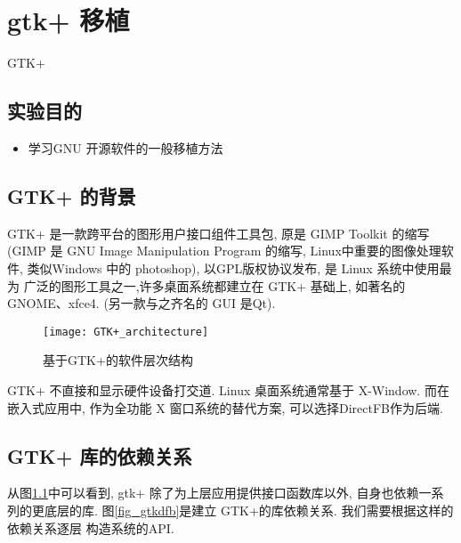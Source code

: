 \chapter{gtk+ 移植}{GTK+}

\section{实验目的}
\begin{itemize}
  \item 学习GNU 开源软件的一般移植方法
\end{itemize}

\section{GTK+ 的背景}
    GTK+ 是一款跨平台的图形用户接口组件工具包, 原是 GIMP Toolkit 的缩写
(GIMP 是 GNU Image Manipulation Program 的缩写, Linux中重要的图像处理软件,
类似Windows 中的 photoshop), 以GPL版权协议发布, 是 Linux 系统中使用最为
广泛的图形工具之一,许多桌面系统都建立在 GTK+ 基础上, 如著名的 GNOME、xfce4.
(另一款与之齐名的 GUI 是Qt).

\begin{figure}[!h]
  \centering
  \texttt{[image: GTK+\_architecture]}
    \caption[基于GTK+的软件层次结构]
    {基于GTK+的软件层次结构\footnotemark} \label{fig_gtk}
\end{figure}

    GTK+ 不直接和显示硬件设备打交道. Linux 桌面系统通常基于 X-Window. 而在
嵌入式应用中, 作为全功能 X 窗口系统的替代方案, 可以选择DirectFB作为后端. 

\section{GTK+ 库的依赖关系}
从图\ref{fig_gtk}中可以看到, 
gtk+ 除了为上层应用提供接口函数库以外, 自身也依赖一系列的更底层的库.
图\ref{fig_gtkdfb}是建立 GTK+的库依赖关系. 我们需要根据这样的依赖关系逐层
构造系统的API.

